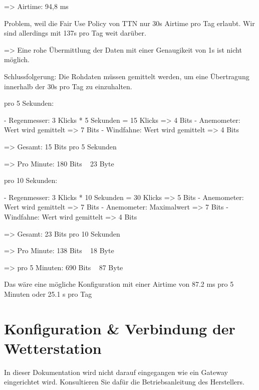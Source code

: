 \documentclass[12pt]{article}
\begin{document}
      => Airtime: 94,8 ms

      Problem, weil die Fair Use Policy von TTN nur 30s Airtime pro Tag erlaubt. Wir sind allerdings mit 137s pro Tag weit darüber.

      => Eine rohe Übermittlung der Daten mit einer Genaugikeit von 1s ist nicht möglich.

      Schlussfolgerung: Die Rohdaten müssen gemittelt werden, um eine Übertragung innerhalb der 30s pro Tag zu einzuhalten.

      
      pro 5 Sekunden:

      - Regenmesser: 3 Klicks * 5 Sekunden = 15 Klicks => 4 Bits
      - Anemometer: Wert wird gemittelt => 7 Bits
      - Windfahne: Wert wird gemittelt => 4 Bits

      => Gesamt: 15 Bits pro 5 Sekunden

      => Pro Minute: 180 Bits ~ 23 Byte


      pro 10 Sekunden:

      - Regenmesser: 3 Klicks * 10 Sekunden = 30 Klicks => 5 Bits
      - Anemometer: Wert wird gemittelt => 7 Bits
      - Anemometer: Maximalwert => 7 Bits
      - Windfahne: Wert wird gemittelt => 4 Bits

      => Gesamt: 23 Bits pro 10 Sekunden

      => Pro Minute: 138 Bits ~ 18 Byte

      => pro 5 Minuten: 690 Bits ~ 87 Byte

      Das wäre eine mögliche Konfiguration mit einer Airtime von 87.2 ms pro 5 Minuten oder 25.1 s pro Tag
  
      

  \section{Konfiguration \& Verbindung der Wetterstation}
    In dieser Dokumentation wird nicht darauf eingegangen wie ein Gateway eingerichtet wird.
    Konsultieren Sie dafür die Betriebsanleitung des Herstellers.
\end{document}
